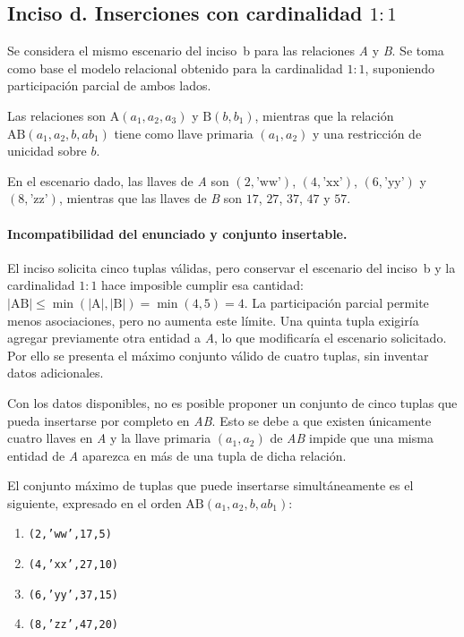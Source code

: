 
\subsection{Inciso d. Inserciones con cardinalidad $1:1$}

Se considera el mismo escenario del inciso~b para las relaciones
\emph{A} y \emph{B}. Se toma como base el modelo relacional obtenido
para la cardinalidad $1:1$, suponiendo participación parcial de ambos
lados.

Las relaciones son
$\mathrm{A}(a_1,a_2,a_3)$ y $\mathrm{B}(b,b_1)$, mientras que la
relación $\mathrm{AB}(a_1,a_2,b,ab_1)$ tiene como llave primaria
$(a_1,a_2)$ y una restricción de unicidad sobre $b$.

En el escenario dado, las llaves de \emph{A} son
$(2,\text{'ww'})$, $(4,\text{'xx'})$, $(6,\text{'yy'})$ y
$(8,\text{'zz'})$, mientras que las llaves de \emph{B} son
$17$, $27$, $37$, $47$ y $57$.

\paragraph{Incompatibilidad del enunciado y conjunto insertable.}

El inciso solicita cinco tuplas válidas, pero conservar el escenario del
inciso~b y la cardinalidad $1:1$ hace imposible cumplir esa cantidad:
$|\mathrm{AB}|\leq\min(|\mathrm{A}|,|\mathrm{B}|)=\min(4,5)=4$.
La participación parcial permite menos asociaciones, pero no aumenta este
límite. Una quinta tupla exigiría agregar previamente otra entidad a
\emph{A}, lo que modificaría el escenario solicitado. Por ello se presenta
el máximo conjunto válido de cuatro tuplas, sin inventar datos adicionales.


Con los datos disponibles, no es posible proponer un conjunto de cinco
tuplas que pueda insertarse por completo en \emph{AB}. Esto se debe
a que existen únicamente cuatro llaves en \emph{A} y la llave primaria
$(a_1,a_2)$ de \emph{AB} impide que una misma entidad de \emph{A}
aparezca en más de una tupla de dicha relación.

El conjunto máximo de tuplas que puede insertarse simultáneamente
es el siguiente, expresado en el orden
$\mathrm{AB}(a_1,a_2,b,ab_1)$:

\begin{enumerate}[label=\roman*.,leftmargin=*,itemsep=0.2em]
    \item \texttt{(2,'ww',17,5)}
    \item \texttt{(4,'xx',27,10)}
    \item \texttt{(6,'yy',37,15)}
    \item \texttt{(8,'zz',47,20)}
\end{enumerate}

